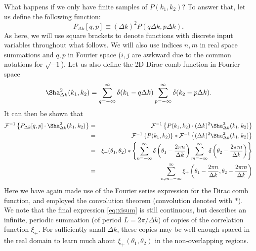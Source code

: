 \documentclass[preprint]{aastex}
\begin{document}
What happens if we only have finite samples of $P(k_1, k_2)$?  To
answer that, let us define the following function:
\begin{equation}
P_{\Delta k} [q, p] \equiv (\Delta k)^2 P(q \Delta k, p \Delta k).
\end{equation}
As here, we will use square brackets to denote functions with discrete input
variables throughout what follows.  We will also use indices $n, m$ in
real space summations and $q, p$ in Fourier space ($i,j$ are awkward
due to the common notations for $\sqrt{-1}$).  Let us also define the 2D Dirac
comb function in Fourier space
\begin{equation}
\Sha^2_{\Delta k} (k_1, k_2) = \sum_{q = -\infty}^{\infty} \delta(k_1
- q \Delta k) \sum_{p = -\infty}^{\infty} \delta(k_2
- p \Delta k).
\end{equation}
It can then be shown that
\begin{eqnarray}
\mathcal{F}^{-1} \left\{ P_{\Delta k} [q, p] \cdot  \Sha^2_{\Delta k} (k_1,
  k_2) \right\} & = & \mathcal{F}^{-1} \left\{ P(k_1, k_2) \cdot  (\Delta
  k)^2 \Sha^2_{\Delta k} (k_1,
  k_2) \right\}  \nonumber  \\
 & = & \mathcal{F}^{-1} \left\{ P(k_1, k_2) \right\} * \mathcal{F}^{-1} \left\{  (\Delta
  k)^2 \Sha^2_{\Delta k} (k_1, k_2) \right\} \nonumber \\
 & = & \xi_+(\theta_1, \theta_2 )  * \left\{ \sum_{n = -\infty}^{\infty} \delta\left(\theta_1
- \frac{2 \pi n}{\Delta k} \right) \sum_{m = -\infty}^{\infty}
\delta\left( \theta_2
- \frac{2 \pi m}{\Delta k} \right)  \right\} \nonumber \\
& = & \sum_{n,m=-\infty}^{\infty} \xi_+\left(\theta_1
- \frac{2 \pi n}{\Delta k},  \theta_2
- \frac{2 \pi m}{\Delta k} \right) \label{eq:xisum}
\end{eqnarray}
Here we have again made use of the Fourier series expression for the
Dirac comb function, and employed the convolution theorem (convolution
denoted with $*$).  We note that the final expression \eqref{eq:xisum}
is still continuous, but describes an infinite, periodic summation (of period $L = 2 \pi
/ \Delta k$) of copies of the correlation function $\xi_+$.  For sufficiently small
$\Delta k$, these copies may be well-enough spaced in the real domain to
learn much about $\xi_+(\theta_1, \theta_2)$ in the non-overlapping
regions.
\end{document}
